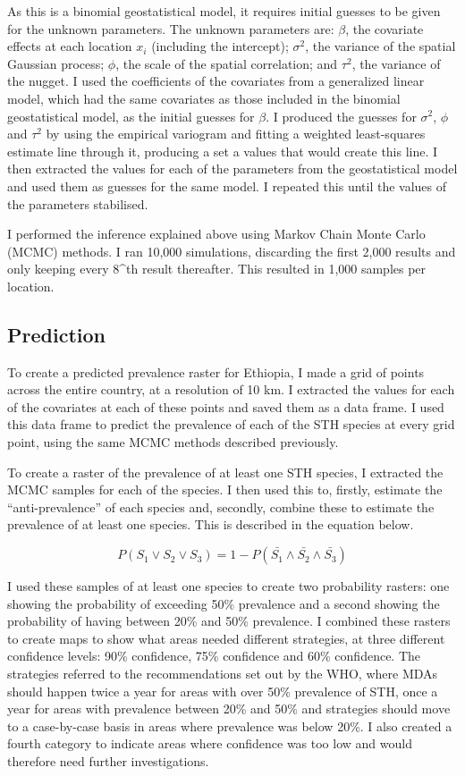 \documentclass[
]{article}
\begin{document}
As this is a binomial geostatistical model, it requires initial guesses
to be given for the unknown parameters. The unknown parameters are:
\(\beta\), the covariate effects at each location \(x_i\) (including the
intercept); \(\sigma^2\), the variance of the spatial Gaussian process;
\(\phi\), the scale of the spatial correlation; and \(\tau^2\), the
variance of the nugget. I used the coefficients of the covariates from a
generalized linear model, which had the same covariates as those
included in the binomial geostatistical model, as the initial guesses
for \(\beta\). I produced the guesses for \(\sigma^2\), \(\phi\) and
\(\tau^2\) by using the empirical variogram and fitting a weighted
least-squares estimate line through it, producing a set a values that
would create this line. I then extracted the values for each of the
parameters from the geostatistical model and used them as guesses for
the same model. I repeated this until the values of the parameters
stabilised.

I performed the inference explained above using Markov Chain Monte Carlo
(MCMC) methods. I ran 10,000 simulations, discarding the first 2,000
results and only keeping every 8\^{}th result thereafter. This resulted
in 1,000 samples per location.

\hypertarget{prediction}{%
\subsection{Prediction}\label{prediction}}

To create a predicted prevalence raster for Ethiopia, I made a grid of
points across the entire country, at a resolution of 10 km. I extracted
the values for each of the covariates at each of these points and saved
them as a data frame. I used this data frame to predict the prevalence
of each of the STH species at every grid point, using the same MCMC
methods described previously.

To create a raster of the prevalence of at least one STH species, I
extracted the MCMC samples for each of the species. I then used this to,
firstly, estimate the ``anti-prevalence'' of each species and, secondly,
combine these to estimate the prevalence of at least one species. This
is described in the equation below.

\[ P(S_1 \vee S_2 \vee S_3) = 1 - P(\bar{S_1} \wedge \bar{S_2} \wedge \bar{S_3}) \]

I used these samples of at least one species to create two probability
rasters: one showing the probability of exceeding 50\% prevalence and a
second showing the probability of having between 20\% and 50\%
prevalence. I combined these rasters to create maps to show what areas
needed different strategies, at three different confidence levels: 90\%
confidence, 75\% confidence and 60\% confidence. The strategies referred
to the recommendations set out by the WHO, where MDAs should happen
twice a year for areas with over 50\% prevalence of STH, once a year for
areas with prevalence between 20\% and 50\% and strategies should move
to a case-by-case basis in areas where prevalence was below 20\%. I also
created a fourth category to indicate areas where confidence was too low
and would therefore need further investigations.
\end{document}
